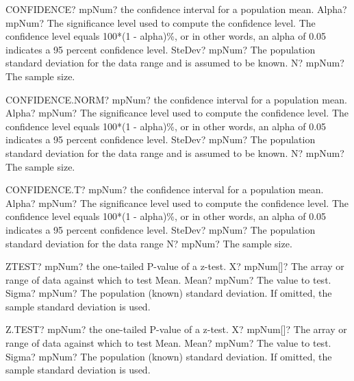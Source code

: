 \documentclass[12pt,a4paper,openany]{book}
\begin{document}
\begin{mpFunctionsExtract}
\mpWorksheetFunctionThreeNotImplemented
{CONFIDENCE? mpNum? the confidence interval for a population mean.}
{Alpha? mpNum? The significance level used to compute the confidence level. The confidence level equals 100*(1 - alpha)\%, or in other words, an alpha of 0.05 indicates a 95 percent confidence level.
}
{SteDev? mpNum? The population standard deviation for the data range and is assumed to be known.}
{N? mpNum? The sample size.}
\end{mpFunctionsExtract}

\begin{mpFunctionsExtract}
\mpWorksheetFunctionThreeNotImplemented
{CONFIDENCE.NORM? mpNum? the confidence interval for a population mean.}
{Alpha? mpNum? The significance level used to compute the confidence level. The confidence level equals 100*(1 - alpha)\%, or in other words, an alpha of 0.05 indicates a 95 percent confidence level.
}
{SteDev? mpNum? The population standard deviation for the data range and is assumed to be known.}
{N? mpNum? The sample size.}
\end{mpFunctionsExtract}

\begin{mpFunctionsExtract}
\mpWorksheetFunctionThreeNotImplemented
{CONFIDENCE.T? mpNum? the confidence interval for a population mean.}
{Alpha? mpNum? The significance level used to compute the confidence level. The confidence level equals 100*(1 - alpha)\%, or in other words, an alpha of 0.05 indicates a 95 percent confidence level.
}
{SteDev? mpNum? The population standard deviation for the data range}
{N? mpNum? The sample size.}
\end{mpFunctionsExtract}

\begin{mpFunctionsExtract}
\mpWorksheetFunctionThreeNotImplemented
{ZTEST? mpNum? the one-tailed P-value of a z-test.}
{X? mpNum[]? The array or range of data against which to test Mean.}
{Mean? mpNum? The value to test.}
{Sigma? mpNum? The population (known) standard deviation. If omitted, the sample standard deviation is used.}
\end{mpFunctionsExtract}

\begin{mpFunctionsExtract}
\mpWorksheetFunctionThreeNotImplemented
{Z.TEST? mpNum? the one-tailed P-value of a z-test.}
{X? mpNum[]? The array or range of data against which to test Mean.}
{Mean? mpNum? The value to test.}
{Sigma? mpNum? The population (known) standard deviation. If omitted, the sample standard deviation is used.}
\end{mpFunctionsExtract}
\end{document}
